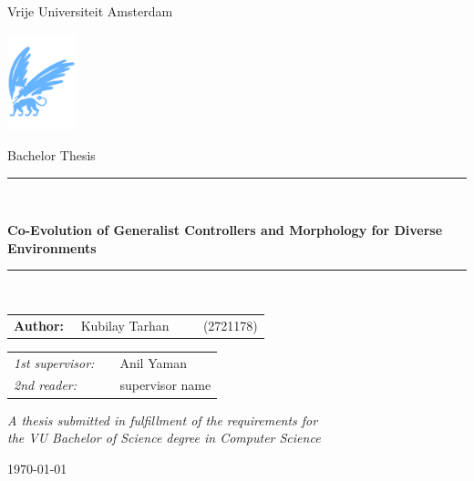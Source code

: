 \documentclass[11pt]{article}
\begin{document}
\thispagestyle{empty}

\begin{center}

      Vrije Universiteit Amsterdam

      \vspace{1mm}

      \includegraphics[height=28mm]{./resources/vu-griffioen.pdf}

      \vspace{1.5cm}

      {\Large Bachelor Thesis}

      \vspace*{1.5cm}

      \rule{.9\linewidth}{.6pt}\\[0.4cm]
      {\huge \bfseries Co-Evolution of Generalist Controllers and Morphology for Diverse Environments\par}
      \vspace{0.4cm}
      \rule{.9\linewidth}{.6pt}\\[1.5cm]

      \vspace*{2mm}

      {\Large
            \begin{tabular}{l}
                  {\bf Author:} ~~Kubilay Tarhan ~~~~ (2721178)
            \end{tabular}
      }

      \vspace*{1.5cm}

      \begin{tabular}{ll}
            {\it 1st supervisor:}   & ~~Anil Yaman                               \\
            {\it 2nd reader:}       & ~~supervisor name
      \end{tabular}

      \vspace*{2cm}

      \textit{A thesis submitted in fulfillment of the requirements for\\ the VU Bachelor of Science degree in Computer Science }

      \vspace*{1cm}

      \today\\[4cm] %

\end{center}
\end{document}
